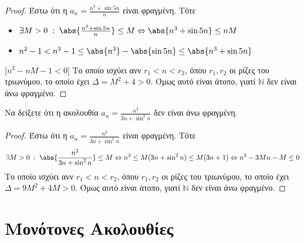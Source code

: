 \begin{enumerate}
        \begin{proof}
        \item {}
            Έστω ότι η $ a_{n}= \frac{n^{3}+ \sin{5n}}{n} $ είναι φραγμένη. 
            Τότε 

            \begin{minipage}{0.6\textwidth}
                \begin{itemize}
                    \item $ \exists M>0 \; : \; \abs{\frac{n^{3}+ 
                            \sin{5n}}{n}} \leq M \Leftrightarrow \abs{n^{3}+ 
                        \sin{5n}} \leq nM  \; $ 
                        \hfill {}
                    \item $ n^{2}-1 < n^{3}-1 \leq \abs{n^{3}}- \abs{\sin{5n}} 
                        \leq \abs{n^{3}+ \sin{5n}}$ 
                        \hfill {}
                \end{itemize}
            \end{minipage}

            [$n^{2}-nM-1<0 $] 
            Το οποίο ισχύει ανν $ r_{1}<n< r_{2} $,
            όπου $ r_{1}, r_{2} $ οι ρίζες του τριωνύμου, το οποίο έχει $ 
            \Delta= M^{2} + 4 > 0$. Όμως αυτό είναι άτοπο, γιατί $ \mathbb{N} $ 
            δεν είναι άνω φραγμένο.
        \end{proof}

    \item Να δείξετε ότι η ακολουθία $ a_{n} = \frac{n^{2}}{3n+ 
        \sin^{2}{n}} $ δεν είναι άνω φραγμένη.

        \begin{proof}
        \item {}
            Έστω ότι η $ a_{n}= \frac{n^{2}}{3n+ \sin^{2}{n}} $ είναι φραγμένη.
            Τότε 
            \[
                \exists M>0 \; : \; \abs{\frac{n^{2}}{3n+ \sin^{2}{n}}} 
                \leq M \Leftrightarrow n^{2} \leq M(3n+ \sin^{2}{n}) \leq 
                M(3n+1) \Leftrightarrow n^{2}-3Mn-M \leq 0
            \]
            Το οποίο ισχύει ανν $ r_{1}<n< r_{2} $,
            όπου $ r_{1}, r_{2} $ οι ρίζες του τριωνύμου, το οποίο έχει $ 
            \Delta= 9M^{2}+4M >0 $. Όμως αυτό είναι άτοπο, γιατί $ \mathbb{N} $ 
            δεν είναι άνω φραγμένο.
        \end{proof}
\end{enumerate}



\section{Μονότονες Ακολουθίες}




